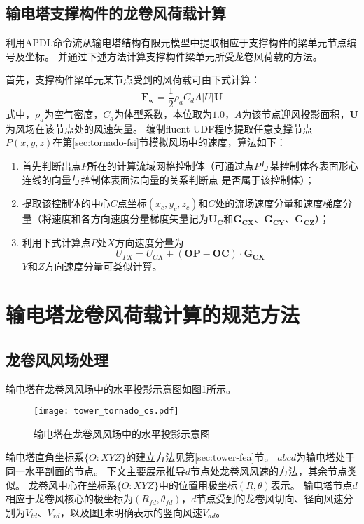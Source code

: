 \subsection{输电塔支撑构件的龙卷风荷载计算}\label{sec:brace-load}
利用APDL命令流从输电塔结构有限元模型中提取相应于支撑构件的梁单元节点编号及坐标。
并通过下述方法计算支撑构件梁单元所受龙卷风荷载的方法。

首先，支撑构件梁单元某节点受到的风荷载可由下式计算\cite{savory2001modelling}：
\begin{equation}
	\bm{F_w} = \frac{1}{2} \rho_a C_d A |U| \bm{U}
\end{equation}
式中，$\rho_a$为空气密度，$C_d$为体型系数，本位取为$1.0$，$A$为该节点迎风投影面积，$\bm{U}$为风场在该节点处的风速矢量。
编制fluent UDF程序提取任意支撑节点$P(x, y, z)$在第\ref{sec:tornado-fsi}节模拟风场中的速度，算法如下：

\begin{enumerate}
	\item
	      首先判断出点$P$所在的计算流域网格控制体（可通过点$P$与某控制体各表面形心连线的向量与控制体表面法向量的关系判断点 是否属于该控制体）；
	\item
	      提取该控制体的中心$C$点坐标$(x_c, y_c, z_c)$和$C$处的流场速度分量和速度梯度分量（将速度和各方向速度分量梯度矢量记为$\bm{U_C}$和$\bm{G_{CX}}$、$\bm{G_{CY}}$、$\bm{G_{CZ}}$）；
	\item
	      利用下式计算点$P$处$X$方向速度分量为
	      \begin{equation}
	      	U_{PX} = U_{CX} + (\bm{OP}-\bm{OC})\cdot \bm{G_{CX}}
	      \end{equation}
	      $Y$和$Z$方向速度分量可类似计算。
\end{enumerate}


\section{输电塔龙卷风荷载计算的规范方法}\label{sec:static-code}

\subsection{龙卷风风场处理}
输电塔在龙卷风风场中的水平投影示意图如图\ref{fig:tower-tornado-cs}所示。
\begin{figure}[!htpb]
	\centering
	\texttt{[image: tower\_tornado\_cs.pdf]}
	\caption{输电塔在龙卷风风场中的水平投影示意图}
	\label{fig:tower-tornado-cs}
\end{figure}
输电塔直角坐标系$\{O: XYZ\}$的建立方法见第\ref{sec:tower-fea}节。
$abcd$为输电塔处于同一水平剖面的节点。
下文主要展示推导$d$节点处龙卷风风速的方法，其余节点类似。
龙卷风中心在坐标系$\{O: XYZ\}$中的位置用极坐标$(R, \theta)$表示。
输电塔节点$d$相应于龙卷风核心的极坐标为$(R_{fd}, \theta_{fd})$，$d$节点受到的龙卷风切向、径向风速分别为$V_{td}$、$V_{rd}$，以及图\ref{fig:tower-tornado-cs}未明确表示的竖向风速$V_{ad}$。

